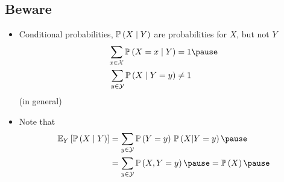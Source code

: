 \begin{slide}
\section[-2]{Beware}

\begin{PauseHighLight}
  \begin{itemize}\squeeze
  \item Conditional probabilities, $\mathbb{P}\left( X\mid Y \right)$ are probabilities
    for $X$, but not $Y$
    \begin{align*}
      \sum_{x\in\mathcal{X}} \Prob{X=x\mid Y} &= 1 \pause \\
      \sum_{y\in\mathcal{Y}} \Prob{X\mid Y=y} &\neq 1
    \end{align*}
    (in general)\pause
  \item Note that
    \begin{align*}
      \av[Y]{\Prob{X\mid Y}} &= \sum_{y\in\mathcal{Y}} \Prob{Y=y}\,
                               \Prob{X|Y=y}\pause \\
      &= \sum_{y\in\mathcal{Y}} \Prob{X,Y=y}\pause = \Prob{X}\pause
    \end{align*}
  \end{itemize}
\end{PauseHighLight}

\end{slide}

